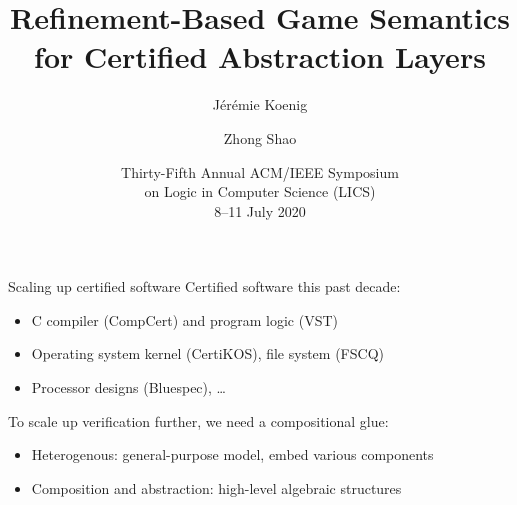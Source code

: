 \documentclass[aspectratio=54]{beamer}
\title[Refinement-Based Game Semantics]%
  {Refinement-Based Game Semantics \\ for Certified Abstraction Layers}
\author{J\'er\'emie Koenig \and Zhong Shao}
\institute[]{Yale University}
\date[LICS'2020]{%
  Thirty-Fifth Annual ACM/IEEE Symposium \\
  on Logic in Computer Science (LICS) \\
  8–11 July 2020}
\begin{document}
\begin{frame}
\titlepage
\end{frame}


\begin{frame}{Scaling up certified software} %
  Certified software this past decade:
  \begin{itemize}
    \item C compiler (CompCert) and program logic (VST)
    \item Operating system kernel (CertiKOS), file system (FSCQ)
    \item Processor designs (Bluespec), \ldots
  \end{itemize}

  \pause
  To scale up verification further, we need a compositional glue:
  \begin{itemize}
    \item Heterogenous: general-purpose model, embed various components
    \item Composition and abstraction: high-level algebraic structures
  \end{itemize}
\end{frame}
\end{document}
